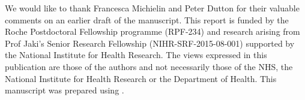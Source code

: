 \documentclass[article]{jss}\usepackage[]{graphicx}\usepackage[]{color}
\begin{document}
We would like to thank Francesca Michielin and Peter Dutton for their valuable comments 
on an earlier draft of the manuscript. This report is funded by the Roche Postdoctoral Fellowship programme (RPF-234) and research arising from Prof Jaki's Senior Research Fellowship (NIHR-SRF-2015-08-001) supported by the National Institute for Health Research. The views expressed in this publication are those of the authors and not necessarily those of the NHS, the National Institute for Health Research or the Department of Health. This manuscript was prepared using  \citep{knitr2018}.


\end{document}

